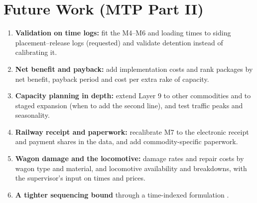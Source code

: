 \section{Future Work (MTP Part II)}
\begin{enumerate}
    \item \textbf{Validation on time logs:} fit the M4--M6 and loading times to siding placement--release logs (requested) and validate detention instead of calibrating it.
    \item \textbf{Net benefit and payback:} add implementation costs and rank packages by net benefit, payback period and cost per extra rake of capacity.
    \item \textbf{Capacity planning in depth:} extend Layer 9 to other commodities and to staged expansion (when to add the second line), and test traffic peaks and seasonality.
    \item \textbf{Railway receipt and paperwork:} recalibrate M7 to the electronic receipt and payment shares in the data, and add commodity-specific paperwork.
    \item \textbf{Wagon damage and the locomotive:} damage rates and repair costs by wagon type and material, and locomotive availability and breakdowns, with the supervisor's input on times and prices.
    \item \textbf{A tighter sequencing bound} through a time-indexed formulation \cite{sousa}.
\end{enumerate}
